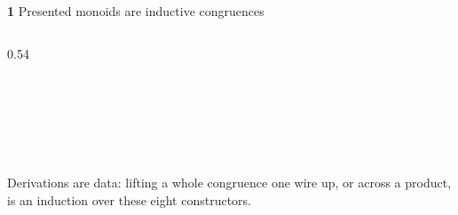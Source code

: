 \begin{frame}{\textbf{1}\; Presented monoids are inductive congruences}
\begin{columns}[c]
\begin{column}{0.54\textwidth}
\begin{code}
\AgdaSpace{}%
\AgdaSpace{}%
\AgdaSpace{}%
\AgdaSpace{}%
\AgdaSpace{}%
\AgdaSpace{}%
\AgdaSpace{}%
\AgdaSpace{}%
\AgdaSpace{}%
\<%
\\
%
\>[2]%
\>[8]\AgdaSymbol{:}\AgdaSpace{}%
\AgdaSpace{}%
\AgdaSpace{}%
\AgdaSpace{}%
\AgdaSpace{}%
\AgdaSpace{}%
\AgdaSpace{}%
\AgdaSpace{}%
\AgdaSpace{}%
\AgdaSpace{}%
\AgdaSpace{}%
\AgdaSpace{}%
\AgdaSpace{}%
\AgdaSpace{}%
\AgdaSpace{}%
\<%
\\
%
\>[2]%
\>[13]\AgdaSymbol{:}\AgdaSpace{}%
\AgdaSymbol{(}\AgdaSpace{}%
\AgdaSpace{}%
\AgdaSymbol{)}\AgdaSpace{}%
\AgdaSpace{}%
\AgdaSpace{}%
\AgdaSpace{}%
\AgdaSpace{}%
\AgdaSpace{}%
\AgdaSymbol{(}\AgdaSpace{}%
\AgdaSpace{}%
\AgdaSymbol{)}\<%
\\
%
\>[2]%
\>[13]\AgdaSymbol{:}\AgdaSpace{}%
\AgdaSpace{}%
\AgdaSpace{}%
\AgdaSpace{}%
\AgdaSpace{}%
\<%
\\
%
\>[2]\AgdaSpace{}%
\AgdaSymbol{:}\AgdaSpace{}%
\AgdaSpace{}%
\AgdaSpace{}%
\AgdaSpace{}%
\AgdaSpace{}%
\<%
\\
%
\>[2]%
\>[13]\AgdaSymbol{:}\AgdaSpace{}%
\AgdaSpace{}%
\AgdaOperator{\AgdaPostulate{===}}\AgdaSpace{}%
\AgdaSpace{}%
\AgdaSpace{}%
\AgdaSpace{}%
\AgdaSpace{}%
\<%
\end{code}
\begin{win}
\small Derivations are \alert{data}: lifting a whole congruence one wire up, or
across a product, is an induction over these eight constructors.
\end{win}
\end{column}
\end{columns}
\end{frame}

